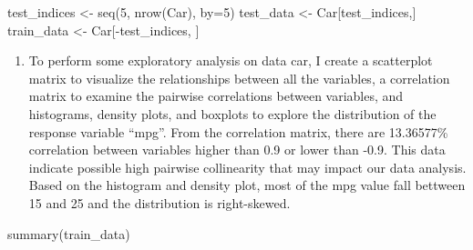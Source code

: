 \documentclass[
]{article}
\newenvironment{Shaded}{\begin{snugshade}}{\end{snugshade}}
\newcommand{\AttributeTok}[1]{\textcolor[rgb]{0.77,0.63,0.00}{#1}}
\newcommand{\DecValTok}[1]{\textcolor[rgb]{0.00,0.00,0.81}{#1}}
\newcommand{\FunctionTok}[1]{\textcolor[rgb]{0.00,0.00,0.00}{#1}}
\newcommand{\NormalTok}[1]{#1}
\newcommand{\OtherTok}[1]{\textcolor[rgb]{0.56,0.35,0.01}{#1}}
\newcommand{\SpecialCharTok}[1]{\textcolor[rgb]{0.00,0.00,0.00}{#1}}
\providecommand{\tightlist}{%
  \setlength{\itemsep}{0pt}\setlength{\parskip}{0pt}}
\begin{document}
\begin{Shaded}
\begin{Highlighting}[]
\NormalTok{test\_indices }\OtherTok{\textless{}{-}} \FunctionTok{seq}\NormalTok{(}\DecValTok{5}\NormalTok{, }\FunctionTok{nrow}\NormalTok{(Car), }\AttributeTok{by=}\DecValTok{5}\NormalTok{)}
\NormalTok{test\_data }\OtherTok{\textless{}{-}}\NormalTok{ Car[test\_indices,] }
\NormalTok{train\_data }\OtherTok{\textless{}{-}}\NormalTok{ Car[}\SpecialCharTok{{-}}\NormalTok{test\_indices, ]}
\end{Highlighting}
\end{Shaded}

\begin{enumerate}
\def\labelenumi{\arabic{enumi}.}
\tightlist
\item
  To perform some exploratory analysis on data car, I create a
  scatterplot matrix to visualize the relationships between all the
  variables, a correlation matrix to examine the pairwise correlations
  between variables, and histograms, density plots, and boxplots to
  explore the distribution of the response variable ``mpg''. From the
  correlation matrix, there are 13.36577\% correlation between variables
  higher than 0.9 or lower than -0.9. This data indicate possible high
  pairwise collinearity that may impact our data analysis. Based on the
  histogram and density plot, most of the mpg value fall bettween 15 and
  25 and the distribution is right-skewed.
\end{enumerate}

\begin{Shaded}
\begin{Highlighting}[]
\FunctionTok{summary}\NormalTok{(train\_data)}
\end{Highlighting}
\end{Shaded}
\end{document}
